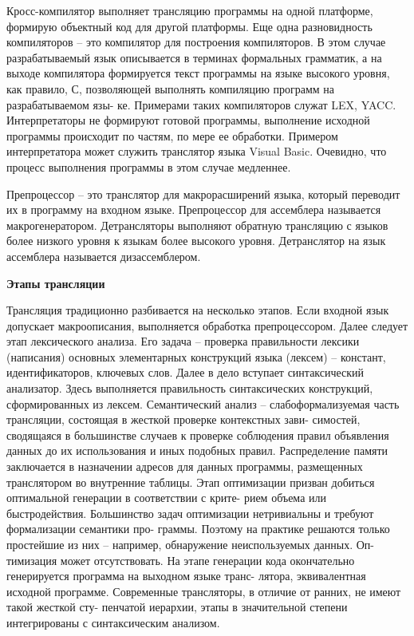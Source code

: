 Кросс-компилятор выполняет трансляцию программы на одной платформе, формирую объектный код для другой платформы. Еще одна разновидность компиляторов –  это компилятор для построения компиляторов. В этом случае разрабатываемый язык описывается в терминах формальных грамматик, а на выходе компилятора формируется текст программы на языке высокого уровня, как правило, С, позволяющей выполнять компиляцию программ на разрабатываемом язы- ке. Примерами таких компиляторов служат LEX, YACC. Интерпретаторы не формируют готовой программы, выполнение исходной программы происходит по частям, по мере ее обработки. Примером интерпретатора может служить транслятор языка Visual Basic. Очевидно, что процесс выполнения программы в этом случае медленнее.

Препроцессор – это транслятор для макрорасширений языка, который переводит их в программу на входном языке. Препроцессор для ассемблера называется макрогенератором. Детрансляторы выполняют обратную трансляцию с языков более низкого уровня к языкам более высокого уровня. Детранслятор на язык ассемблера называется дизассемблером.

\begin{center}{\bfseries Этапы трансляции}
\end{center}

Трансляция традиционно разбивается на несколько этапов. Если входной язык допускает макроописания, выполняется обработка препроцессором. Далее следует этап лексического анализа. Его задача – проверка правильности лексики (написания) основных элементарных конструкций языка (лексем) – констант, идентификаторов, ключевых слов. Далее в дело вступает синтаксический анализатор. Здесь выполняется правильность синтаксических конструкций, сформированных из лексем. Семантический анализ – слабоформализуемая часть трансляции, состоящая в жесткой проверке контекстных зави- симостей, сводящаяся в большинстве случаев к проверке соблюдения правил объявления данных до их использования и иных подобных правил. Распределение памяти заключается в назначении адресов для данных программы, размещенных транслятором во внутренние таблицы. Этап оптимизации призван добиться оптимальной генерации в соответствии с крите- рием объема или быстродействия. Большинство задач оптимизации нетривиальны и требуют формализации семантики про- граммы. Поэтому на практике решаются только простейшие из них – например, обнаружение неиспользуемых данных. Оп- тимизация может отсутствовать. На этапе генерации кода окончательно генерируется программа на выходном языке транс- лятора, эквивалентная исходной программе. Современные трансляторы, в отличие от ранних, не имеют такой жесткой сту- пенчатой иерархии, этапы в значительной степени интегрированы с синтаксическим анализом.


